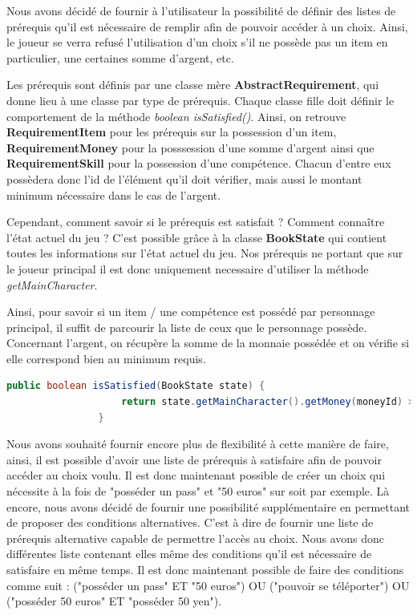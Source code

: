			Nous avons décidé de fournir à l'utilisateur la possibilité de définir des listes de prérequis qu'il est nécessaire de remplir afin de pouvoir accéder à un choix. Ainsi, le joueur se verra refusé l'utilisation d'un choix s'il ne possède pas un item en particulier, une certaines somme d'argent, etc.

			Les prérequis sont définis par une classe mère \textbf{AbstractRequirement}, qui donne lieu à une classe par type de prérequis. Chaque classe fille doit définir le comportement de la méthode \textit{boolean isSatisfied()}. Ainsi, on retrouve \textbf{RequirementItem} pour les prérequis sur la possession d'un item, \textbf{RequirementMoney} pour la posssession d'une somme d'argent ainsi que \textbf{RequirementSkill} pour la possession d'une compétence. Chacun d'entre eux possèdera donc l'id de l'élément qu'il doit vérifier, mais aussi le montant minimum nécessaire dans le cas de l'argent.

			Cependant, comment savoir si le prérequis est satisfait ? Comment connaître l'état actuel du jeu ? C'est possible grâce à la classe \textbf{BookState} qui contient toutes les informations sur l'état actuel du jeu. Nos prérequis ne portant que sur le joueur principal il est donc uniquement necessaire d'utiliser la méthode \textit{getMainCharacter}.

			Ainsi, pour savoir si un item / une compétence est possédé par personnage principal, il suffit de parcourir la liste de ceux que le personnage possède. Concernant l'argent, on récupère la somme de la monnaie possédée et on vérifie si elle correspond bien au minimum requis.

			\begin{lstlisting}[gobble=16, language=java, caption=RequirementMoney.isSatisfied(), label=lst:isSatisfied]
				public boolean isSatisfied(BookState state) {
					return state.getMainCharacter().getMoney(moneyId) >= amount;
				}
			\end{lstlisting}

			Nous avons souhaité fournir encore plus de flexibilité à cette manière de faire, ainsi, il est possible d'avoir une liste de prérequis à satisfaire afin de pouvoir accéder au choix voulu. Il est donc maintenant possible de créer un choix qui nécessite à la fois de "posséder un pass" et "50 euros" sur soit par exemple. Là encore, nous avons décidé de fournir une possibilité supplémentaire en permettant de proposer des conditions alternatives. C'est à dire de fournir une liste de prérequis alternative capable de permettre l'accès au choix. Nous avons donc différentes liste contenant elles même des conditions qu'il est nécessaire de satisfaire en même temps. Il est donc maintenant possible de faire des conditions comme suit : ("posséder un pass" ET "50 euros") OU ("pouvoir se téléporter") OU ("posséder 50 euros" ET "posséder 50 yen").

